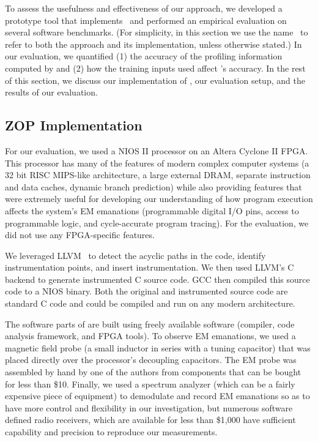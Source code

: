 To assess the usefulness and effectiveness of our approach, we developed a prototype tool that implements \zop\ and performed an empirical evaluation on several software benchmarks. (For simplicity, in this section we use the name \zop\ to refer to both the approach and its implementation, unless otherwise stated.) In our evaluation, we quantified (1) the accuracy of the profiling information computed by \zop and (2) how the training inputs used affect \zop's accuracy. In the rest of this section, we discuss our implementation of \zop, our evaluation setup, and the results of our evaluation.


\subsection{ZOP Implementation} 
\label{sec:implementation-1}

For our evaluation, we used a NIOS II processor on an Altera Cyclone II FPGA. This processor has many of the features of modern complex computer systems (\eg a 32 bit RISC MIPS-like architecture, a large external DRAM, separate instruction and data caches, dynamic branch prediction) while also providing features that were extremely useful for developing our understanding of how program execution affects the system's EM emanations (\eg programmable digital I/O pins, access to programmable logic, and cycle-accurate program tracing). For the evaluation, we did not use any FPGA-specific features.

We leveraged LLVM~\cite{LLVM} to detect the acyclic paths in the code, identify instrumentation points, and insert instrumentation. We then used LLVM's C backend to generate instrumented C source code. GCC then compiled this source code to a NIOS binary. Both the original and instrumented source code are standard C code and could be compiled and run on any modern architecture.

The software parts of \zop are built using freely available software (\ie compiler, code analysis framework, and FPGA tools). To observe EM emanations, we used a magnetic field probe (a small inductor in series with a tuning capacitor) that was placed directly over the processor's decoupling capacitors. The EM probe was assembled by hand by one of the authors from components that can be bought for less than \$10. Finally, we used a spectrum analyzer (which can be a fairly expensive piece of equipment) to demodulate and record EM emanations so as to have more control and flexibility in our investigation, but numerous software defined radio receivers, which are available for less than \$1,000 have sufficient capability and precision to reproduce our measurements.

